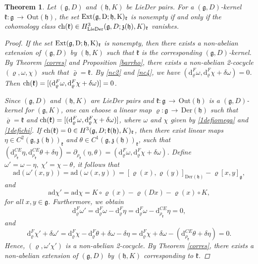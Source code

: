 \documentclass[12pt]{amsart}
\newtheorem{thm}{Theorem}[section]
\newcommand{\lon }{\,\rightarrow\,}
\newcommand{\g}{\mathfrak g}
\newcommand{\h}{\mathfrak h}
\newcommand{\frkk}{\mathfrak k}
\newcommand{\frkz}{\mathfrak z}
\newcommand{\dM}{\mathrm{d}}
\newcommand{\LD}{{\rm LieDer }}
\newcommand{\Der}{\mathrm{Der}}
\newcommand{\Out}{\mathrm{Out}}
\newcommand{\ad}{\mathrm{ad}}
\begin{document}
\begin{thm}\label{classofkernel}
  Let $(\g, D)$ and $(\h, K)$ be \LD pairs. For a $(\g,D)$-kernel $\frkk:\g\lon\Out(\h)$, the set $\rm{Ext}(\g,D;\h,K)_{\frkk}$ is nonempty if and only if the cohomology class ${\rm ch}(\frkk)\in H^3_{\LD}(\g,D;\frkz(\h),K)_{\frkk}$ vanishes.
    \begin{proof}
        If the set $\rm{Ext}(\g,D;\h,K)_{\frkk}$ is nonempty, then there exists a non-abelian extension of $(\g, D)$ by $(\h, K)$ such that $\frkk$ is the corresponding $(\g, D)$-kernel. By Theorem \ref{corres} and Proposition \ref{barrho}, there exists a non-abelian 2-cocycle $(\varrho, \omega, \chi)$ such that $\bar{\varrho}=\frkk$. By \eqref{nc2} and \eqref{nc4}, we have
$(\dM^F_{\varrho}\omega,\dM^F_{\varrho}\chi+\delta\omega)=0$. Then ${\rm ch}(\frkk)=[(\dM^F_{\varrho}\omega,\dM^F_{\varrho}\chi+\delta\omega)]=0$.

        Since $(\g, D)$ and $(\h, K)$ are \LD pairs and $\frkk:\g\lon\Out(\h)$ is a $(\g,D)$-kernel for $(\g,K)$, one can choose a linear map $\varrho:\g\lon\Der(\h)$ such that $\overline{\varrho}=\frkk$ and ${\rm ch}(\frkk)=[(\dM^F_{\varrho}\omega,\dM^F_{\varrho}\chi+\delta\omega)]$, where $\omega$ and $\chi$ given by \eqref{1defiomega} and \eqref{1defichi}. If ${\rm ch}(\frkk)=0\in H^3(\g,D;\frkk(\h),K)_{\frkk}$, then there exist linear maps $\eta\in C^2(\g,\frkz(\h))_{\frkk}$ and $\theta\in C^1(\g,\frkz(\h))_{\frkk}$, such that $(\dM^{CE}_{\rho_{\frkk}}\eta,\dM^{CE}_{\rho_{\frkk}}\theta+\delta\eta)=\partial_{\rho_\frkk}(\eta,\theta)=(\dM^F_{\varrho}\omega,\dM^F_{\varrho}\chi+\delta\omega)$. Define
        $\omega'=\omega-\eta, \  \chi'=\chi-\theta$, it follows that 
        \begin{equation*}
            \ad(\omega'(x,y))=\ad(\omega(x,y))=[\varrho(x),\varrho(y)]_{\Der(\h)}-\varrho[x,y]_{\g},
        \end{equation*}
        and
        \begin{equation*}
            \ad\chi'=\ad\chi=K\circ\varrho(x)-\varrho(Dx)-\varrho(x)\circ K,
        \end{equation*}
        for all $x,y\in\g$. Furthermore, we obtain
        \begin{equation*}
            \dM^F_{\varrho}\omega'=\dM^F_{\varrho}\omega-\dM^F_{\varrho}\eta=\dM^F_{\varrho}\omega-\dM^{CE}_{\rho_{\frkk}}\eta=0,
        \end{equation*}
        and
        \begin{equation*}
            \dM^F_{\varrho}\chi'+\delta\omega'=\dM^F_{\varrho}\chi-\dM^F_{\varrho}\theta+\delta\omega-\delta\eta=\dM^F_{\varrho}\chi+\delta\omega-(\dM^{CE}_{\rho_{\frkk}}\theta+\delta\eta)=0.
        \end{equation*}
        Hence, $(\varrho,\omega'\chi')$ is a non-abelian 2-cocycle. By Theorem \ref{corres},  there exists a non-abelian extension of $(\g, D)$ by $(\h, K)$ corresponding to $\frkk$.
    \end{proof}
\end{thm}
\end{document}
